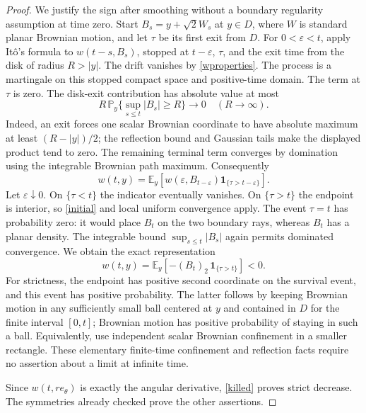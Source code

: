 \documentclass[11pt]{article}
\newcommand{\E}{\mathbb E}
\newcommand{\Pp}{\mathbb P}
\begin{document}
\begin{proof}
We justify the sign after smoothing without a boundary regularity
assumption at time zero. Start $B_s=y+\sqrt2 W_s$ at $y\in D$, where
$W$ is standard planar Brownian motion, and let $\tau$ be its first
exit from $D$. For $0<\varepsilon<t$, apply It\^o's formula to
$w(t-s,B_s)$, stopped at $t-\varepsilon$, $\tau$, and the exit time
from the disk of radius $R>|y|$. The drift vanishes by
\eqref{wproperties}. The process is a martingale on this stopped
compact space and positive-time domain. The term at $\tau$ is zero.
The disk-exit contribution has absolute value at most
\[
 R\,\Pp_y\{\sup_{s\leq t}|B_s|\geq R\}\longrightarrow0
                       \quad(R\to\infty).
\]
Indeed, an exit forces one scalar Brownian coordinate to have absolute
maximum at least $(R-|y|)/2$; the reflection bound and Gaussian tails
make the displayed product tend to zero. The remaining terminal term
converges by domination using the integrable Brownian path maximum.
Consequently
\[
 w(t,y)=\E_y\!\left[
 w(\varepsilon,B_{t-\varepsilon})
                      \mathbf1_{\{\tau>t-\varepsilon\}}\right].
\]
Let $\varepsilon\downarrow0$. On $\{\tau<t\}$ the indicator
eventually vanishes. On $\{\tau>t\}$ the endpoint is interior, so
\eqref{initial} and local uniform convergence apply. The event
$\tau=t$ has probability zero: it would place $B_t$ on the two
boundary rays, whereas $B_t$ has a planar density. The integrable
bound $\sup_{s\leq t}|B_s|$ again permits dominated convergence.
We obtain the exact representation
\begin{equation}\label{killed}
 w(t,y)=\E_y\!\left[-(B_t)_2\,\mathbf1_{\{\tau>t\}}\right]<0.
\end{equation}
For strictness, the endpoint has positive second coordinate on the
survival event, and this event has positive probability. The latter
follows by keeping Brownian motion in any sufficiently small ball
centered at $y$ and contained in $D$ for the finite interval $[0,t]$;
Brownian motion has positive probability of staying in such a ball.
Equivalently, use independent scalar Brownian confinement in a smaller
rectangle. These elementary finite-time confinement and reflection
facts require no assertion about a limit at infinite time.

Since $w(t,r e_\theta)$ is exactly the angular derivative,
\eqref{killed} proves strict decrease. The symmetries already checked
prove the other assertions.
\end{proof}
\end{document}

